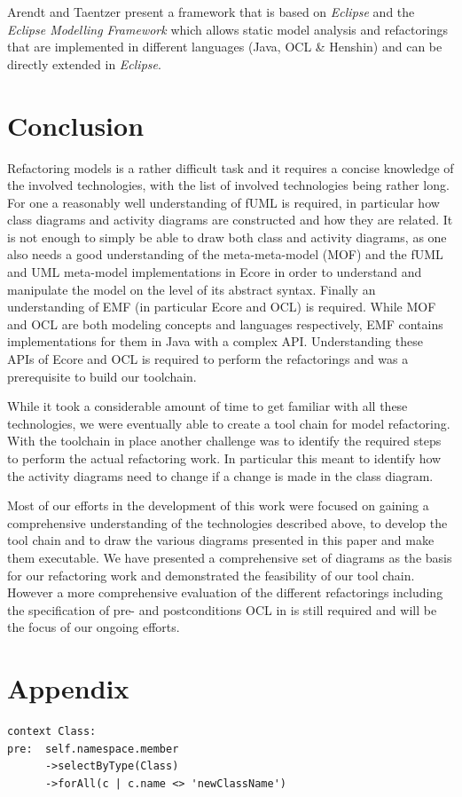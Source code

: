 \documentclass{llncs}
\begin{document}

Arendt and Taentzer \cite{DBLP:journals/ase/ArendtT13} present a framework that is based on \textit{Eclipse} and the
\textit{Eclipse Modelling Framework} which allows static model analysis and refactorings that are implemented in
different languages (Java, OCL \& Henshin) and can be directly extended in \textit{Eclipse}.


\section{Conclusion}
\label{sec:conclusion}
Refactoring models is a rather difficult task and it requires a concise knowledge of the involved technologies, with
the list of involved technologies being rather long. For one a reasonably well understanding of fUML is required, in
particular how class diagrams and activity diagrams are constructed and how they are related. It is not enough to simply
be able to draw both class and activity diagrams, as one also needs a good understanding of the meta-meta-model (MOF) and
the fUML and UML meta-model implementations in Ecore in order to understand and manipulate the model on the level of its 
abstract syntax. Finally an understanding of EMF (in particular Ecore and OCL) is required. While MOF and OCL are both 
modeling concepts and languages respectively, EMF contains implementations for them in Java with a complex API. 
Understanding these APIs of Ecore and OCL is required to perform the refactorings and was a prerequisite to build
our toolchain.

While it took a considerable amount of time to get familiar with all these technologies, we were eventually able to
create a tool chain for model refactoring. With the toolchain in place another challenge was to identify the required 
steps to perform the actual refactoring work. In particular this meant to identify how the activity diagrams need to 
change if a change is made in the class diagram.

Most of our efforts in the development of this work were focused on gaining a comprehensive understanding of the
technologies described above, to develop the tool chain and to draw the various diagrams presented in this paper and make 
them executable. We have presented a comprehensive set of diagrams as the basis for our refactoring work and demonstrated 
the feasibility of our tool chain. However a more comprehensive evaluation of the different refactorings including the 
specification of pre- and postconditions OCL in is still required and will be the focus of our ongoing efforts.

\newpage



\newpage
\appendix
\section{Appendix}
\label{sec:appendix}

\begin{lstlisting}[language=OCL,caption=OCL for rename class,label=lst:renameclass]
context Class:
pre:  self.namespace.member
      ->selectByType(Class)
      ->forAll(c | c.name <> 'newClassName')
\end{lstlisting}
\end{document}
